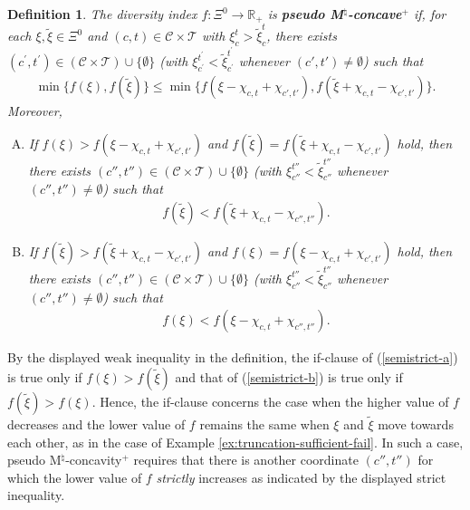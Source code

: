 \documentclass[12pt]{amsart}
\newtheorem{definition}{Definition}
\theoremstyle{remark}
\begin{document}
\begin{definition}\label{def:semistrict-Mc}
The diversity index $f: \Xi^0 \rightarrow \mathbb{R}_+$ is \textbf{pseudo M$^\natural$-concave$^+$} if, for each $\xi, \tilde{\xi} \in \Xi^0$ and $(c, t) \in \mathcal{C} \times \mathcal{T}$ with $\xi_c^t>\tilde{\xi}_{c}^t$, there exists $\left(c^{\prime}, t^{\prime}\right) \in (\mathcal{C} \times \mathcal{T})\cup\{\emptyset\}$ (with $\xi_{c^{\prime}}^{t^{\prime}}<\tilde{\xi}_{c^{\prime}}^{t^{\prime}}$ whenever $(c',t')\neq \emptyset$) such that
\begin{align*}
\min\{f(\xi),f(\tilde{\xi})\}\leq\min\{f(\xi-\chi_{c,t}+\chi_{c',t'}), f(\tilde{\xi}+\chi_{c,t}-\chi_{c',t'})\}.
\end{align*}
Moreover,
\begin{enumerate}[(A)]
\item \label{semistrict-a}
If $f(\xi)>f(\xi-\chi_{c,t}+\chi_{c',t'})$ and $f(\tilde{\xi})=f(\tilde{\xi}+\chi_{c,t}-\chi_{c',t'})$ hold, then there exists $\left(c'', t''\right) \in (\mathcal{C} \times \mathcal{T})\cup\{\emptyset\}$ (with $\xi_{c''}^{t''}<\tilde{\xi}_{c''}^{t''}$ whenever $(c'',t'')\neq \emptyset$) such that
\begin{align*}
f(\tilde{\xi})<f(\tilde{\xi}+\chi_{c,t}-\chi_{c'',t''}).
\end{align*}
\item \label{semistrict-b}
If $f(\tilde{\xi})>f(\tilde{\xi}+\chi_{c,t}-\chi_{c',t'})$ and $f(\xi)=f(\xi-\chi_{c,t}+\chi_{c',t'})$ hold, then there exists $\left(c'', t''\right) \in (\mathcal{C} \times \mathcal{T})\cup\{\emptyset\}$ (with $\xi_{c''}^{t''}<\tilde{\xi}_{c''}^{t''}$ whenever $(c'',t'')\neq \emptyset$) such that
\begin{align*}
f(\xi)<f(\xi-\chi_{c,t}+\chi_{c'',t''}).
\end{align*}
\end{enumerate}
\end{definition}
By the displayed weak inequality in the definition, the if-clause of (\ref{semistrict-a})
is true only if $f(\xi)>f(\tilde \xi)$ and that of (\ref{semistrict-b}) is true only if $f(\tilde \xi)>f(\xi)$.
Hence, the if-clause concerns the case when the higher value of $f$ decreases and the lower value of $f$ remains
the same when $\xi$ and $\tilde \xi$ move towards each other, as in the case of Example \ref{ex:truncation-sufficient-fail}.
In such a case, pseudo M$^\natural$-concavity$^+$ requires that there is another coordinate $(c'',t'')$ for which
the lower value of $f$ {\it strictly} increases as indicated by the displayed strict inequality.
\end{document}

